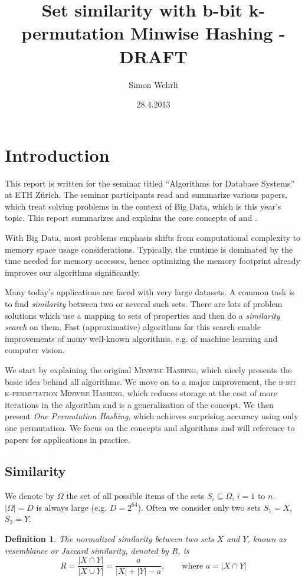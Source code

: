 \documentclass[a4paper]{article}
\author{Simon Wehrli}
\date{28.4.2013}
\title{Set similarity with b-bit k-permutation Minwise Hashing - DRAFT}
\newtheorem{mydef}{Definition}
\begin{document}
 
\maketitle

\section{Introduction}
This report is written for the seminar titled ``Algorithms for Database Systems'' at ETH Z\"{u}rich. The seminar participants read and summarize various papers, which treat solving problems in the context of Big Data, which is this year's topic. This report summarizes and explains the core concepts of \citep{LiK11} and \citep{LiOwZhang12}.

With Big Data, most problems emphasis shifts from computational complexity to memory space usage considerations. Typically, the runtime is dominated by the time needed for memory accesses, hence optimizing the memory footprint already improves our algorithms significantly. 

Many today's applications are faced with very large datasets. A common task is to find \emph{similarity} between two or several such sets. There are lots of problem solutions which use a mapping to sets of properties and then do a \emph{similarity search} on them. Fast (approximative) algorithms for this search enable improvements of many well-known algorithms, e.g. of machine learning and computer vision.

We start by explaining the original \textsc{Minwise Hashing}, which nicely presents the basic idea behind all algorithms. We move on to a major improvement, the \textsc{b-bit k-permutation Minwise Hashing}, which reduces storage at the cost of more iterations in the algorithm and is a generalization of the concept. We then present \emph{One Permutation Hashing}, which achieves surprising accuracy using only one permutation. We focus on the concepts and algorithms and will reference to papers for applications in practice.

\subsection{Similarity}
We denote by $\Omega$ the set of all possible items of the sets $S_i \subseteq \Omega$, $i = 1 \text{ to } n$. $\left| \Omega \right| = D$ is always large (e.g. $D=2^{64}$). Often we consider only two sets $S_1 = X$, $S_2 = Y$.

\begin{framed}
\begin{mydef}\label{def:jaccard}
The normalized similarity between two sets $X$ and $Y$, known as \emph{resemblance} or \emph{Jaccard similarity}, denoted by R, is
\begin{equation}
R=\frac{\left| X \cap Y \right|}{\left| X \cup Y \right|} = \frac{a}{\left| X \right| + \left| Y \right| -a}, \qquad \text{where } a=\left| X \cap Y \right|
\end{equation}
\end{mydef}
\end{framed}
\end{document}
